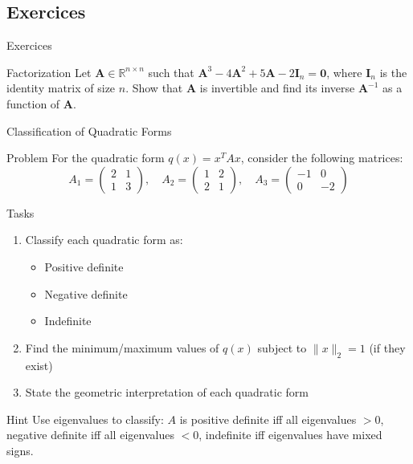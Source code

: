 \documentclass[aspectratio=1610]{beamer}
\begin{document}
\subsection{Exercices}

\begin{frame}{Exercices}
  \begin{block}{Factorization}
    Let $\mathbf{A}\in\mathbb{R}^{n\times n}$ such that $\mathbf{A}^3 -4\mathbf{A}^2 + 5\mathbf{A} - 2\mathbf{I}_n = \mathbf{0}$, where $\mathbf{I}_n$ is the identity matrix of size $n$.
    Show that $\mathbf{A}$ is invertible and find its inverse $\mathbf{A}^{-1}$ as a function of $\mathbf{A}$.
  \end{block}
\end{frame}

\begin{frame}{Classification of Quadratic Forms}

\begin{block}{Problem}
For the quadratic form $q(x) = x^TAx$, consider the following matrices:
$$A_1 = \begin{pmatrix} 2 & 1 \\ 1 & 3 \end{pmatrix}, \quad A_2 = \begin{pmatrix} 1 & 2 \\ 2 & 1 \end{pmatrix}, \quad A_3 = \begin{pmatrix} -1 & 0 \\ 0 & -2 \end{pmatrix}$$
\end{block}

\begin{block}{Tasks}
\begin{enumerate}
\item Classify each quadratic form as:
\begin{itemize}
\item Positive definite
\item Negative definite  
\item Indefinite
\end{itemize}
\item Find the minimum/maximum values of $q(x)$ subject to $\|x\|_2 = 1$ (if they exist)
\item State the geometric interpretation of each quadratic form
\end{enumerate}
\end{block}

\begin{block}{Hint}
Use eigenvalues to classify: $A$ is positive definite iff all eigenvalues $> 0$, negative definite iff all eigenvalues $< 0$, indefinite iff eigenvalues have mixed signs.
\end{block}

\end{frame}
\end{document}
